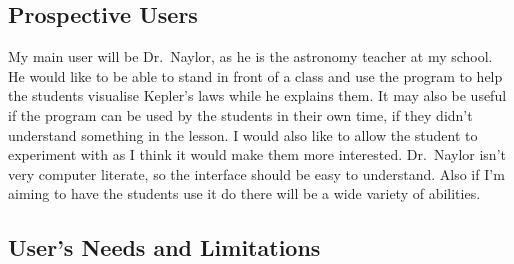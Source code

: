 \documentclass[a4paper,11pt,titlepage]{article}
\begin{document}
\subsection{Prospective Users}
My main user will be Dr.~Naylor, as he is the astronomy teacher at my school. He
would like to be able to stand in front of a class and use the program to help
the students visualise Kepler's laws while he explains them. It may also be
useful if the program can be used by the students in their own time, if they
didn't understand something in the lesson. I would also like to allow the
student to experiment with as I think it would make them more interested.
Dr.~Naylor isn't very computer literate, so the interface should be easy to
understand. Also if I'm aiming to have the students use it do there will be a
wide variety of abilities.

\subsection{User's Needs and Limitations}
\end{document}
